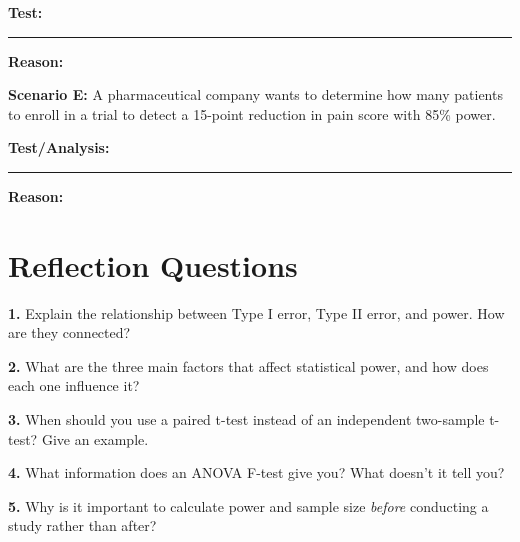 \documentclass[11pt]{article}
\begin{document}
\vspace{0.3cm}

\textbf{Test:} \rule{6cm}{0.4pt}

\vspace{0.3cm}

\textbf{Reason:}

\vspace{2cm}

\textbf{Scenario E:} A pharmaceutical company wants to determine how many patients to enroll in a trial to detect a 15-point reduction in pain score with 85\% power.

\vspace{0.3cm}

\textbf{Test/Analysis:} \rule{6cm}{0.4pt}

\vspace{0.3cm}

\textbf{Reason:}

\vspace{2cm}

\newpage

\section*{Reflection Questions}

\textbf{1.} Explain the relationship between Type I error, Type II error, and power. How are they connected?

\vspace{3cm}

\textbf{2.} What are the three main factors that affect statistical power, and how does each one influence it?

\vspace{3cm}

\textbf{3.} When should you use a paired t-test instead of an independent two-sample t-test? Give an example.

\vspace{3cm}

\textbf{4.} What information does an ANOVA F-test give you? What doesn't it tell you?

\vspace{3cm}

\textbf{5.} Why is it important to calculate power and sample size \textit{before} conducting a study rather than after?

\vspace{3cm}
\end{document}
